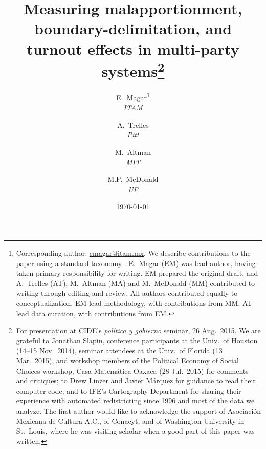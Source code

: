 \documentclass[letter,12pt]{article}
\begin{document}
\title{Measuring malapportionment, boundary-delimitation, and turnout effects in multi-party systems\thanks{For presentation at CIDE's \emph{pol\'itica y gobierno} seminar, 26 Aug.\ 2015. We are grateful to Jonathan Slapin, conference participants at the Univ.\ of Houston (14--15 Nov.\ 2014), seminar attendees at the Univ.\ of Florida (13 Mar.\ 2015), and workshop members of the Political Economy of Social Choices workshop, Casa Matem\'atica Oaxaca (28 Jul.\ 2015) for comments and critiques; to Drew Linzer and Javier M\'arquez for guidance to read their computer code; and to IFE's Cartography Department for sharing their experience with automated redistricting since 1996 and most of the data we analyze. The first author would like to acknowledge the support of Asociaci\'on Mexicana de Cultura A.C., of Conacyt, and of Washington University in St.\ Louis, where he was visiting scholar when a good part of this paper was written.}}
\author{E.~Magar\footnote{Corresponding author: \url{emagar@itam.mx}.  We describe contributions to the paper using a standard taxonomy \citep{allen2014credit}. E.~Magar (EM) was lead author, having taken primary responsibility for writing. EM prepared the original draft. and A.~Trelles (AT), M.~Altman (MA) and M.~McDonald (MM) contributed to writing through editing and review. All authors contributed equally to conceptualization. EM lead methodology, with contributions from MM. AT lead data curation, with contributions from EM.} \\ \emph{ITAM} \and
        A.~Trelles \\ \emph{Pitt} \and  
        M.~Altman \\ \emph{MIT} \and
        M.P.~McDonald \\ \emph{UF}
      }
\date{\today}
\maketitle


\end{document}
